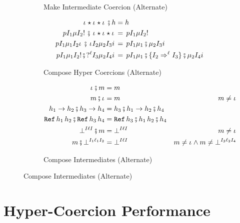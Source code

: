 \documentclass[acmtog, authorversion, acmlarge]{acmart}
\begin{document}
\begin{figure}[tbh]
\begin{subfigure}{.65\textwidth}
\begin{align*}
    \end{align*}
    \caption{Make Intermediate Coercion (Alternate)}
    \label{fig:makeIntCoercion}
  \end{subfigure}
  \begin{subfigure}{.5\textwidth}
    \begin{align*}
      \cmp{\hc{\pmt}{\Dyn}{\id}{\Dyn}{\imt}}{\HC} &= \HC \\
      \cmp{\hc{\Prj}{\I_1}{\Med}{\I_2}{\inj}} %
          {\hc{\pmt}{\Dyn}{\id}{\Dyn}{\imt}} %
      &=  \hc{\Prj}{\I_1}{\Med}{\I_2}{\inj} \\
      \cmp{\hc{\Prj}{\I_1}{\Med_1}{\I_2}{\imt}} %
          {\hc{\pmt}{\I_2}{\Med_2}{\I_3}{\Inj}} %
      &=  \hc{\Prj}{\I_1}{\cmpm{\Med_1}{\Med_2}}{\I_3}{\Inj} \\
      \cmp{\hc{\Prj}{\I_1}{\Med_1}{\I_2}{\inj}} %
          {\hc{\prj{\Lbl}}{\I_3}{\Med_2}{\I_4}{\Inj}} %
      &=  \hc{\Prj}{\I_1}{\cmpm{\cmpm{\Med_1}{\mkIcrcn{\I_2}{\I_3}}}{\Med_2}}{\I_4}{\Inj} %
    \end{align*}
    \caption{Compose Hyper Coercions (Alternate)}
    \label{fig:composeHCAlt}
  \end{subfigure}%
  \begin{subfigure}{.5\textwidth}
    \begin{align*}
      \cmpm{\id}{m} &= m\\
      \cmpm{m}{\id} &= m & m \neq \id \\
      \cmpm{\fn{\HC_1}{\HC_2}}{\fn{\HC_3}{\HC_4}} %
      &= \fn{\cmp{\HC_3}{\HC_1}}{\cmp{\HC_2}{\HC_4}}\\
      \cmpm{\rf{\HC_1}{\HC_2}}{\rf{\HC_3}{\HC_4}} %
      &= \rf{\cmp{\HC_3}{\HC_1}}{\cmp{\HC_2}{\HC_4}}\\
      \cmpm{\failed{\I}{\Lbl}{\I}}{m} &= \failed{\I}{\Lbl}{\I} %
      & m \neq \id \\
      \cmpm{m}{\failed{\I_1}{\Lbl_1}{\I_2}} &= \failed{\I}{\Lbl}{\I} %
      & m \neq \id \wedge m \neq \failed{\I_3}{\Lbl_2}{\I_4}
    \end{align*}
    \caption{Compose Intermediates (Alternate)}
    \label{fig:composeMedAlt}
  \end{subfigure}
\end{figure}

\section{Hyper-Coercion Performance}
\label{sec:perf}
\end{document}
